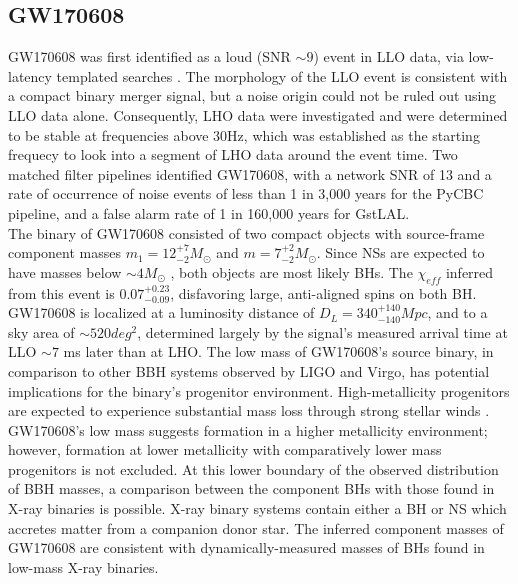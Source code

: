 \documentclass[binding=0.6cm, LaM]{sapthesis}
\begin{document}
\subsection{GW170608}
	GW170608 was first identified as a loud (SNR $\sim9$) event in LLO data,
	via low-latency templated searches \cite{138}.	
	The morphology of the LLO event is consistent with a compact binary merger signal, 
	but a noise origin could not be ruled out using LLO data alone. 
	Consequently, LHO data were investigated and were determined to be stable 
	at frequencies above 30Hz, which was established as the starting frequecy to look into a segment of LHO data around the event time.
	Two matched filter pipelines identified GW170608, with a network SNR of 13 
	and a rate of occurrence of noise events of less than 1 in 3,000 years for the PyCBC pipeline, 
	and a false alarm rate of 1 in 160,000 years for GstLAL. \\
	The binary of GW170608 consisted of two compact objects with source-frame component masses 
	$m_1 =12^{+7}_{-2}M_\odot$ and $m =7^{+2}_{-2}M_\odot$.  
	Since NSs are expected to have masses below $\sim 4M_\odot$ \cite{141},
	both objects are most likely BHs. 
	The $\chi_{eff}$ inferred from this event is $0.07^{+0.23}_{−0.09}$,
	disfavoring large, anti-aligned spins on both BH. \\
	GW170608 is localized at a luminosity distance of  $D_L = 340^{+140}_{−140}Mpc$, and to a sky area of $\sim520 deg^2$, determined largely by the signal’s measured arrival time at LLO $\sim7$ ms later than at LHO. 
	The low mass of GW170608’s source binary, in comparison to other BBH systems 
	observed by LIGO and Virgo, has potential implications for the binary’s progenitor environment. 
	High-metallicity progenitors are expected to experience substantial mass loss through strong stellar winds \cite{142}.
	GW170608’s low mass suggests formation in a higher metallicity environment; 
	however, formation at lower metallicity with comparatively lower mass progenitors is not excluded. 
	At this lower boundary of the observed distribution of BBH masses, 
	a comparison between the component BHs with those found in X-ray binaries is possible.
	X-ray binary systems contain either a BH or NS which accretes matter from a companion donor star. 
	The inferred component masses of GW170608 are consistent with dynamically-measured masses of BHs found in low-mass X-ray binaries.
\end{document}
